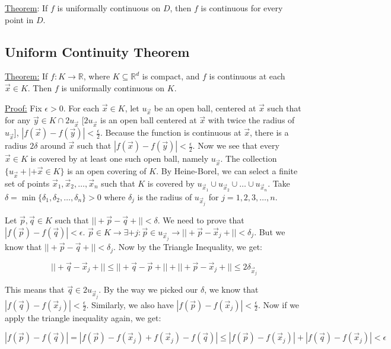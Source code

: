 \documentclass[11 pt, twoside]{article}
\begin{document}
\underline{Theorem}: If $f$ is uniformally continuous on $D$, then $f$ is continuous
for every point in $D$.


\subsection{Uniform Continuity Theorem}
\underline{Theorem:}
If $f: K \to \mathbb{R}$, where $K \subseteq \mathbb{R}^d$ is compact, and
$f$ is continuous at each $\vec{x} \in K$. Then $f$ is uniformally continuous on
$K$.

\underline{Proof:}
Fix $\epsilon > 0$. For each $\vec{x} \in K$, let $u_{\vec{x}}$ be an open ball, centered at
$\vec{x}$ such that for any $\vec{y} \in K \cap 2u_{\vec{x}}$ [$2u_{\vec{x}}$ is
an open ball centered at $\vec{x}$ with twice the radius of $u_{\vec{x}}$], $|f(\vec{x}) -
f(\vec{y})| < \frac{\epsilon}{2}$. Because the function is continuous at
$\vec{x}$, there is a radius $2\delta$ around $\vec{x}$ such that $|f(\vec{x}) -
f(\vec{y})| < \frac{\epsilon}{2}$. Now we see that every $\vec{x} \in K$ is
covered by at least one such open ball, namely $u_{\vec{x}}$. The collection
$\{u_{\vec{x}} +|+ \vec{x} \in K\}$ is an open covering of $K$. By
Heine-Borel, we can select a finite set of points $\vec{x}_1, \vec{x}_2, \dots,
\vec{x}_n$ such that $K$ is covered by $u_{\vec{x}_1} \cup u_{\vec{x}_2} \cup \dots
\cup u_{\vec{x}_n}$. Take $\delta = \min\{\delta_1, \delta_2, \dots, \delta_n\}
> 0$  where $\delta_j$ is the radius of $u_{\vec{x}_j}$ for $j = 1,2,3,\dots,n$.

Let $\vec{p}, \vec{q} \in K$ such that $||+\vec{p} - \vec{q}+|| < \delta$. We
need to prove that $|f(\vec{p}) - f(\vec{q})| < \epsilon$. $\vec{p} \in K \to
\exists + j : \vec{p} \in u_{\vec{x}_j} \to ||+\vec{p} - \vec{x}_j+|| <
\delta_j$. But we know that $||+\vec{p} - \vec{q}+|| < \delta_j$. Now by the
Triangle Inequality, we get:

$$||+\vec{q} - \vec{x}_j+|| \leq ||+\vec{q} - \vec{p}+|| + ||+\vec{p} - \vec{x}_j+||
\leq 2 \delta_{\vec{x}_j}$$

This means that $\vec{q} \in 2u_{\vec{x}_j}$. By the way we picked our $\delta$,
we know that $|f(\vec{q}) - f(\vec{x}_j)| < \frac{\epsilon}{2}$. Similarly,
we also have $|f(\vec{p}) - f(\vec{x}_j)| < \frac{\epsilon}{2}$. Now if we
apply the triangle inequality again, we get:

$$|f(\vec{p}) - f(\vec{q})| = |f(\vec{p}) - f(\vec{x}_j) + f(\vec{x}_j)- f(\vec{q})|\leq |f(\vec{p}) - f(\vec{x}_j)| + |f(\vec{q}) -
f(\vec{x}_j)| < \epsilon$$
\end{document}
